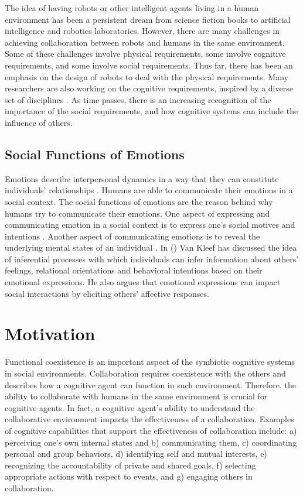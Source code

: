 \documentclass[letterpaper]{article}
\begin{document}
The idea of having robots or other intelligent agents living in a human
environment has been a persistent dream from science fiction books to artificial
intelligence and robotics laboratories. However, there are many challenges in
achieving collaboration between robots and humans in the same environment. Some
of these challenges involve physical requirements, some involve cognitive
requirements, and some involve social requirements. Thus far, there has been an
emphasis on the design of robots to deal with the physical requirements. Many
researchers are also working on the cognitive requirements, inspired by a
diverse set of disciplines
\cite{laird:soar,scheutz:integration-cognition,hemion:cognition-building-blocks}.
As time passes, there is an increasing recognition of the importance of the social
requirements, and how cognitive systems can include the influence of others.

\subsection{Social Functions of Emotions}

Emotions describe interpersonal dynamics in a way that they can constitute
individuals' relationships \cite{parkinson:emotions-social,tiedens:social-life}.
Humans are able to communicate their emotions in a social context. The social
functions of emotions are the reason behind why humans try to communicate their
emotions. One aspect of expressing
and communicating emotion in a social context is to express one's social motives
and intentions \cite{hess:darwin-emotion}. Another aspect of communicating
emotions is to reveal the underlying mental states of an individual
\cite{parkinson:emotion-communication}. In
(\citeyear{kleef:emotion-regulate-social}) Van Kleef has discussed the idea of
inferential processes with which individuals can infer information about others'
feelings, relational orientations and behavioral intentions based on their
emotional expressions. He also argues that emotional expressions can impact
social interactions by eliciting others' affective responses.

\section{Motivation}

Functional coexistence is an important aspect of the symbiotic cognitive
systems in social environments. Collaboration requires coexistence with
the others and describes how a cognitive agent can function in such environment.
Therefore, the ability to collaborate with humans in the same environment is
crucial for cognitive agents. In fact, a cognitive agent's ability to understand
the collaborative environment impacts the effectiveness of a collaboration.
Examples of cognitive capabilities that support the effectiveness of
collaboration include: a) perceiving one's own internal states and b)
communicating them, c) coordinating personal and group behaviors, d) identifying
self and mutual interests, e) recognizing the accountability of private and
shared goals, f) selecting appropriate actions with respect to events, and g)
engaging others in collaboration.
\end{document}
